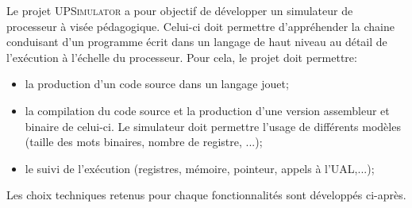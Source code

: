 Le projet \textsc{UPSimulator} a pour objectif de développer un simulateur de processeur à visée pédagogique. Celui-ci doit permettre d'appréhender la chaine conduisant d'un programme écrit dans un langage de haut niveau au détail de l'exécution à l'échelle du processeur. Pour cela, le projet doit permettre:
\begin{itemize}
	\item la production d'un code source dans un langage jouet;
	\item la compilation du code source et la production d'une version assembleur et binaire de celui-ci. Le simulateur doit permettre l'usage de différents modèles (taille des mots binaires, nombre de registre, ...);
	\item le suivi de l'exécution (registres, mémoire, pointeur, appels à l'UAL,...);
\end{itemize}

Les choix techniques retenus pour chaque fonctionnalités sont développés ci-après.